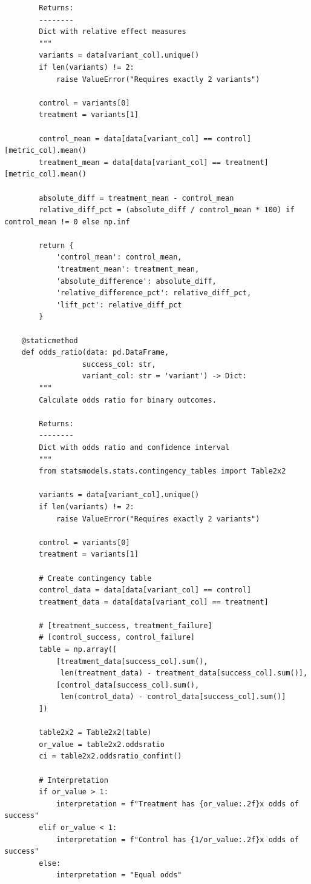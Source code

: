 \begin{lstlisting}
        Returns:
        --------
        Dict with relative effect measures
        """
        variants = data[variant_col].unique()
        if len(variants) != 2:
            raise ValueError("Requires exactly 2 variants")

        control = variants[0]
        treatment = variants[1]

        control_mean = data[data[variant_col] == control][metric_col].mean()
        treatment_mean = data[data[variant_col] == treatment][metric_col].mean()

        absolute_diff = treatment_mean - control_mean
        relative_diff_pct = (absolute_diff / control_mean * 100) if control_mean != 0 else np.inf

        return {
            'control_mean': control_mean,
            'treatment_mean': treatment_mean,
            'absolute_difference': absolute_diff,
            'relative_difference_pct': relative_diff_pct,
            'lift_pct': relative_diff_pct
        }

    @staticmethod
    def odds_ratio(data: pd.DataFrame,
                  success_col: str,
                  variant_col: str = 'variant') -> Dict:
        """
        Calculate odds ratio for binary outcomes.

        Returns:
        --------
        Dict with odds ratio and confidence interval
        """
        from statsmodels.stats.contingency_tables import Table2x2

        variants = data[variant_col].unique()
        if len(variants) != 2:
            raise ValueError("Requires exactly 2 variants")

        control = variants[0]
        treatment = variants[1]

        # Create contingency table
        control_data = data[data[variant_col] == control]
        treatment_data = data[data[variant_col] == treatment]

        # [treatment_success, treatment_failure]
        # [control_success, control_failure]
        table = np.array([
            [treatment_data[success_col].sum(),
             len(treatment_data) - treatment_data[success_col].sum()],
            [control_data[success_col].sum(),
             len(control_data) - control_data[success_col].sum()]
        ])

        table2x2 = Table2x2(table)
        or_value = table2x2.oddsratio
        ci = table2x2.oddsratio_confint()

        # Interpretation
        if or_value > 1:
            interpretation = f"Treatment has {or_value:.2f}x odds of success"
        elif or_value < 1:
            interpretation = f"Control has {1/or_value:.2f}x odds of success"
        else:
            interpretation = "Equal odds"


\end{lstlisting}
